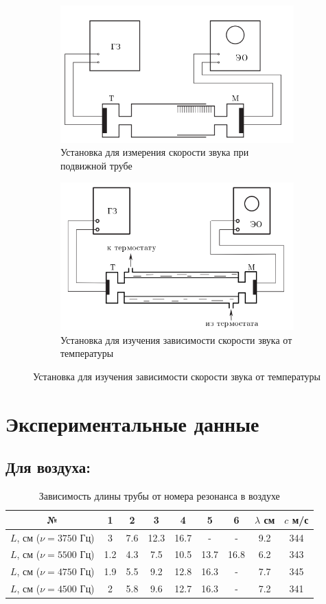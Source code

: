 \begin{figure}
    \centering
    \begin{subfigure}{0.45\linewidth}
        \includegraphics[width=9cm]{setup1.png}
        \caption{Установка для измерения скорости звука при подвижной трубе}
    \end{subfigure}
\hfill
    \begin{subfigure}{0.45\linewidth}
        \includegraphics[width=9cm]{setup2.png}
        \caption{Установка для изучения зависимости скорости звука от температуры}
    \end{subfigure}
\end{figure}



\newpage

\section*{Экспериментальные данные}
\subsection*{Для воздуха:}
\begin{table}[h!]
    \centering
    \begin{tabular}{|c|c|c|c|c|c|c|c|c|}
        \hline
        № &1 & 2 & 3 & 4 & 5 & 6 & $\lambda$ см & $c$ м/с \\\hline
        $L$, см ($\nu = 3750$ Гц) & 3 & 7.6 & 12.3 & 16.7 & - & -  &9.2 & 344  \\\hline
        $L$, см ($\nu = 5500$ Гц) & 1.2& 4.3 &7.5 & 10.5 & 13.7 & 16.8 & 6.2 & 343  \\\hline
        $L$, см ($\nu = 4750$ Гц) & 1.9& 5.5 & 9.2 & 12.8 &16.3 & - & 7.7 &  345 \\\hline
        $L$, см ($\nu = 4500$ Гц) & 2& 5.8 &9.6 & 12.7 & 16.3 & -& 7.2 & 341  \\\hline
    \end{tabular}
    \caption{Зависимость длины трубы от номера резонанса в воздухе}
\end{table}

